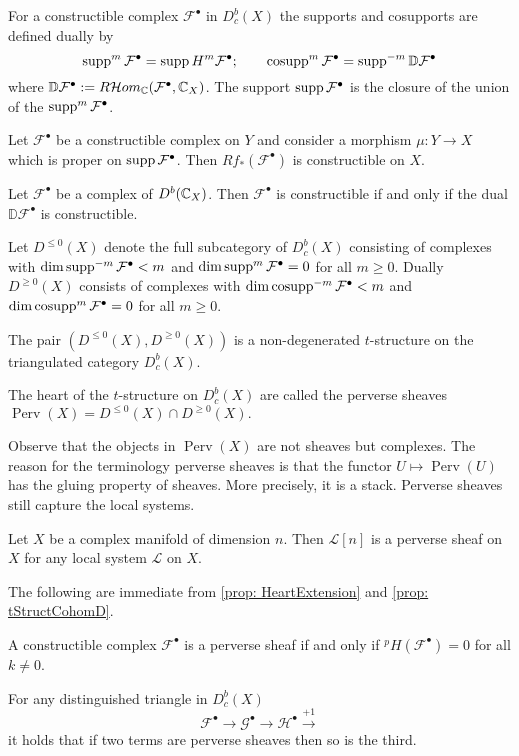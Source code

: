   For a constructible complex $\mathcal{F}^\bullet$ in $D^b_c(X)$ the supports and cosupports are defined dually by
  $$\operatorname{supp}^m\mathcal{F}^\bullet = \operatorname{supp} H^m \mathcal{F}^\bullet; \qquad \operatorname{cosupp}^m\mathcal{F}^\bullet = \operatorname{supp}^{-m}\mathbb{D}\mathcal{F}^\bullet$$
  where $\mathbb{D}\mathcal{F}^\bullet := R \mathcal{H}om_{\mathbb{C}}(\mathcal{F}^\bullet,\mathbb{C}_X)$.
  The support $\operatorname{supp} \mathcal{F}^\bullet$ is the closure of the union of the $\operatorname{supp}^m\mathcal{F}^\bullet$.
  \begin{theorem}{\cite[Theorem 4.1.5.]{dimca2004sheaves}}
    Let $\mathcal{F}^\bullet$ be a constructible complex on $Y$ and consider a morphism $\mu:Y\to X$ which is proper on $\operatorname{supp} \mathcal{F}^\bullet$. Then $Rf_*(\mathcal{F}^\bullet)$ is constructible on $X$.
  \end{theorem}
  \begin{theorem}{\cite[Theorem 4.1.16]{dimca2004sheaves}}
    Let $\mathcal{F}^\bullet$ be a complex of $D^b(\mathbb{C}_X)$. Then $\mathcal{F}^\bullet$ is constructible if and only if the dual $\mathbb{D}\mathcal{F}^\bullet$ is constructible.
  \end{theorem}
  Let $D^{\leq 0}(X)$ denote the full subcategory of $D^b_c(X)$ consisting of complexes with $\dim \operatorname{supp}^{-m} \mathcal{F}^\bullet < m$ and $\dim \operatorname{supp}^m \mathcal{F}^\bullet = 0$ for all $m\geq 0$.
  Dually $D^{\geq 0}(X)$ consists of complexes with $\dim \operatorname{cosupp}^{-m}\mathcal{F}^\bullet <m$ and $\dim \operatorname{cosupp}^m \mathcal{F}^\bullet = 0$ for all $m\geq 0$.
  \begin{proposition}{\cite[Proposition 5.1.12]{dimca2004sheaves}}
    The pair $(D^{\leq 0}(X), D^{\geq 0}(X))$ is a non-degenerated $t$-structure on the triangulated category $D^{b}_c(X)$.
  \end{proposition}
  \begin{definition}
    The heart of the $t$-structure on $D^b_c(X)$ are called the perverse sheaves $\operatorname{Perv}(X) = D^{\leq 0}(X)\cap D^{\geq 0}(X).$
  \end{definition}
  Observe that the objects in $\operatorname{Perv}(X)$ are not sheaves but complexes.
  The reason for the terminology perverse sheaves is that the functor $U\mapsto \operatorname{Perv}(U)$ has the gluing property of sheaves.
  More precisely, it is a stack.
  Perverse sheaves still capture the local systems.
  \begin{theorem}{\cite[Theorem 5.1.20]{dimca2004sheaves}}
    Let $X$ be a complex manifold of dimension $n$. Then $\mathcal{L}[n]$ is a perverse sheaf on $X$ for any local system $\mathcal{L}$ on $X$.
  \end{theorem}
  The following are immediate from \cref{prop: HeartExtension} and \cref{prop: tStructCohomD}.
  \begin{proposition}
    A constructible complex $\mathcal{F}^\bullet$ is a perverse sheaf if and only if $^pH(\mathcal{F}^\bullet) = 0$ for all $k\neq 0$.
  \end{proposition}
  \begin{proposition}
    For any distinguished triangle in $D_c^b(X)$
    $$\mathcal{F}^\bullet \to \mathcal{G}^\bullet \to \mathcal{H}^\bullet \xrightarrow{+1} $$
    it holds that if two terms are perverse sheaves then so is the third.
  \end{proposition}
